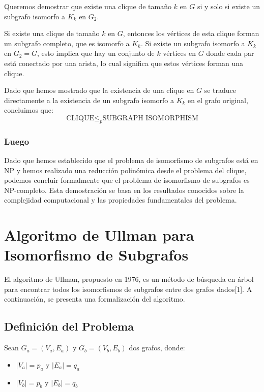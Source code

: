 \documentclass[12pt,a4paper]{article}
\begin{document}
Queremos demostrar que existe una clique de tamaño $k$ en $G$ si y solo si existe un subgrafo isomorfo a $K_k$ en $G_2$.

Si existe una clique de tamaño $k$ en $G$, entonces los vértices de esta clique forman un subgrafo completo, que es isomorfo a $K_k$.
Si existe un subgrafo isomorfo a $K_k$ en $G_2=G$, esto implica que hay un conjunto de $k$ vértices en $G$ donde cada par está conectado por una arista, lo cual significa que estos vértices forman una clique.

Dado que hemos mostrado que la existencia de una clique en $G$ se traduce directamente a la existencia de un subgrafo isomorfo a $K_k$ en el grafo original, concluimos que:
\[
    \text{CLIQUE} \leq_p \text{SUBGRAPH ISOMORPHISM}
\]

\subsubsection{Luego}
Dado que hemos establecido que el problema de isomorfismo de subgrafos está en NP y hemos realizado una reducción polinómica desde el problema del clique, podemos concluir formalmente que el problema de isomorfismo de subgrafos es NP-completo. Esta demostración se basa en los resultados conocidos sobre la complejidad computacional y las propiedades fundamentales del problema.\medspace

\section{Algoritmo de Ullman para Isomorfismo de Subgrafos}

El algoritmo de Ullman, propuesto en 1976, es un método de búsqueda en árbol para encontrar todos los isomorfismos de subgrafos entre dos grafos dados[1]. A continuación, se presenta una formalización del algoritmo.

\subsection{Definición del Problema}

Sean \(G_a = (V_a, E_a)\) y \(G_b = (V_b, E_b)\) dos grafos, donde:

\begin{itemize}
    \item \(|V_a| = p_a\) y \(|E_a| = q_a\)
    \item \(|V_b| = p_b\) y \(|E_b| = q_b\)
\end{itemize}
\end{document}
